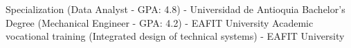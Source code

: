 %
%
%


\begin{scholarship}
					{Specialization (Data Analyst - GPA: 4.8) - Universidad de Antioquia}
					{Bachelor's Degree (Mechanical Engineer - GPA: 4.2) - EAFIT University}
					{Academic vocational training (Integrated design of technical systems) - EAFIT University}

\end{scholarship}